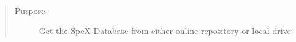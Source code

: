 \documentclass[letterpaper,10pt,english]{sphinxmanual}
\begin{document}

\begin{fulllineitems}
\label{api:splat_db.fetchDatabase}~\begin{quote}\begin{description}
\item[{Purpose}] \leavevmode
Get the SpeX Database from either online repository or local drive

\end{description}\end{quote}

\end{fulllineitems}

\end{document}
